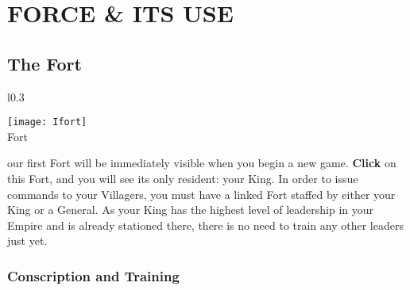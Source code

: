
\chapter[Force \& Its Use]{{\Huge {\Huge F}}ORCE {\Huge \&} {\Huge I}TS {\Huge U}SE}


\section{The Fort}

\begin{wrapfigure}{l}{0.3\textwidth}
    \vspace{-20pt}
    \begin{center}
        \texttt{[image: Ifort]}
        \\ Fort
    \end{center}
    \vspace{-30pt} %
    \end{wrapfigure}

our first Fort will be immediately visible when you begin a new game. \textbf{Click} on this Fort, and you will see its only resident: your King. In order to issue commands to your Villagers, you must have a linked Fort staffed by either your King or a General. As your King has the highest level of leadership in your Empire and is already stationed there, there is no need to train any other leaders just yet.

\subsection{Conscription and Training}

